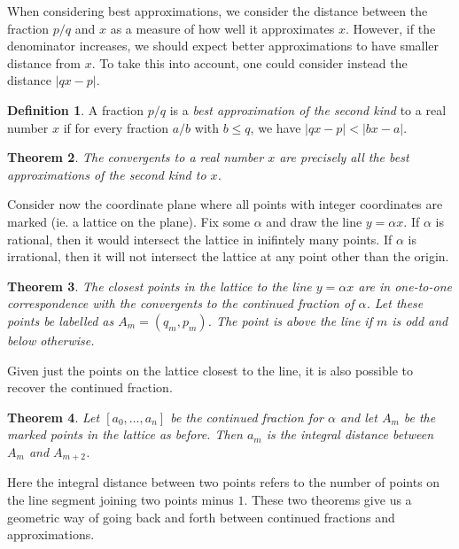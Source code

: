 \documentclass[11pt]{report}
\newtheorem{theorem}{Theorem}[section]
\theoremstyle{definition}
\newtheorem{definition}[theorem]{Definition}
\begin{document}
When considering best approximations, we consider the distance between the fraction $p/q$ and $x$ as a measure of how well it approximates $x$. However, if the denominator increases, we should expect better approximations to have smaller distance from $x$. To take this into account, one could consider instead the distance $|qx - p|$.
\begin{definition}
  A fraction $p/q$ is a \textit{best approximation of the second kind} to a real number $x$ if for every fraction $a/b$ with $b \leq q$, we have $|qx-p| < |bx - a|$.
\end{definition}
\begin{theorem}
  The convergents to a real number $x$ are precisely all the best approximations of the second kind to $x$.
\end{theorem}

Consider now the coordinate plane where all points with integer coordinates are marked (ie. a lattice on the plane). Fix some $\alpha$ and draw the line $y = \alpha x$. If $\alpha$ is rational, then it would intersect the lattice in inifintely many points. If $\alpha$ is irrational, then it will not intersect the lattice at any point other than the origin.
\begin{theorem}
  The closest points in the lattice to the line $y = \alpha x$ are in one-to-one correspondence with the convergents to the continued fraction of $\alpha$. Let these points be labelled as $A_m = (q_m,p_m)$. The point is above the line if $m$ is odd and below otherwise.
\end{theorem}

Given just the points on the lattice closest to the line, it is also possible to recover the continued fraction.
\begin{theorem}
  Let $[a_0,\dots,a_n]$ be the continued fraction for $\alpha$ and let $A_m$ be the marked points in the lattice as before. Then $a_m$ is the integral distance between $A_m$ and $A_{m+2}$.
\end{theorem}
Here the integral distance between two points refers to the number of points on the line segment joining two points minus $1$. These two theorems give us a geometric way of going back and forth between continued fractions and approximations.
\end{document}
